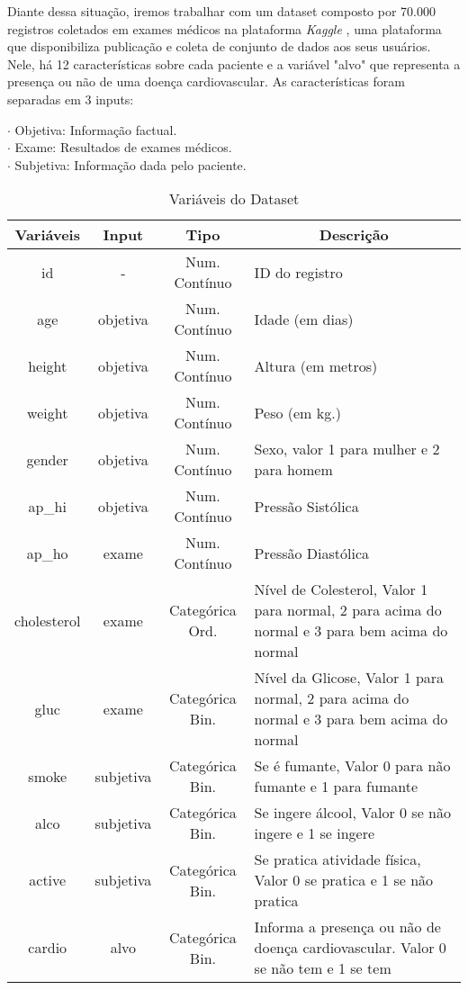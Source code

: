 \documentclass[article,11pt,a4paper,brazil]{abntex2}
\begin{document}
	Diante dessa situação, iremos trabalhar com um dataset composto por 70.000 registros coletados em exames médicos na plataforma \textit{Kaggle} \cite{datasetcardiovascular}, uma plataforma que disponibiliza publicação e coleta de conjunto de dados aos seus usuários. Nele, há 12 características sobre cada paciente e a variável "alvo" que representa a presença ou não de uma doença cardiovascular. As características foram separadas em 3 inputs:
	
	\noindent $\cdot$ Objetiva: Informação factual.\\
	$\cdot$ Exame: Resultados de exames médicos.\\
	$\cdot$ Subjetiva: Informação dada pelo paciente.
	

	\begin{table}[H]
		\caption{Variáveis do Dataset}
		\centering
		\begin{tabular}{|c|c|c|p{8cm}|}
			\hline
			Variáveis & Input & Tipo & \multicolumn{1}{c|}{Descrição}\\
			\hline
			\hline
			id &  - & Num. Contínuo & ID do registro\\
			\hline
			age & objetiva & Num. Contínuo & Idade (em dias)\\
			\hline
			height & objetiva & Num. Contínuo & Altura (em metros)\\
			\hline
			weight & objetiva & Num. Contínuo & Peso (em kg.)\\
			\hline
			gender & objetiva & Num. Contínuo & Sexo, valor 1 para mulher e 2 para homem\\
			\hline
			ap\_hi & objetiva & Num. Contínuo & Pressão Sistólica\\
			\hline
			ap\_ho & exame & Num. Contínuo & Pressão Diastólica\\
			\hline
			cholesterol & exame & Categórica Ord. & Nível de Colesterol, Valor 1 para normal,
			2 para acima do normal e 3 para bem acima do normal\\
			\hline
			gluc & exame & Categórica Bin. & Nível da Glicose, Valor 1 para normal, 2 para acima do normal e 3 para bem acima do normal\\
			\hline
			smoke & subjetiva & Categórica Bin. & Se é fumante, Valor 0 para não fumante e 1 para fumante\\
			\hline
			alco & subjetiva & Categórica Bin. & Se ingere álcool, Valor 0 se não ingere e 1 se ingere\\
			\hline
			active & subjetiva & Categórica Bin. & Se pratica atividade física, Valor 0 se pratica e 1 se não pratica\\ 
			\hline 
			cardio & alvo & Categórica Bin. & Informa a presença ou não de doença cardiovascular. Valor 0 se não tem e 1 se tem\\
			\hline
		\end{tabular}
		\label{table:variaveis}
	\end{table}
\end{document}
